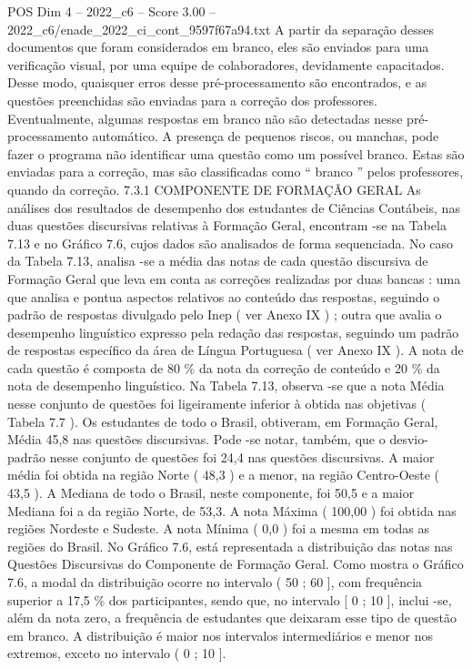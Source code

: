 \begin{textsample}{POS Dim 4 – 2022\_c6 – Score 3.00 – 2022\_c6/enade\_2022\_ci\_cont\_9597f67a94.txt}
A partir da separação desses documentos que foram considerados em branco, eles são enviados para uma verificação visual, por uma equipe de colaboradores, devidamente capacitados.
Desse modo, quaisquer erros desse pré-processamento são encontrados, e as questões preenchidas são enviadas para a correção dos professores.
Eventualmente, algumas respostas em branco não são detectadas nesse pré-processamento automático.
A presença de pequenos riscos, ou manchas, pode fazer o programa não identificar uma questão como um possível branco.
Estas são enviadas para a correção, mas são classificadas como “ branco ” pelos professores, quando da correção. 7.3.1 COMPONENTE DE FORMAÇÃO GERAL As análises dos resultados de desempenho dos estudantes de Ciências Contábeis, nas duas questões discursivas relativas à Formação Geral, encontram -se na Tabela 7.13 e no Gráfico 7.6, cujos dados são analisados de forma sequenciada.
No caso da Tabela 7.13, analisa -se a média das notas de cada questão discursiva de Formação Geral que leva em conta as correções realizadas por duas bancas : uma que analisa e pontua aspectos relativos ao conteúdo das respostas, seguindo o padrão de respostas divulgado pelo Inep ( ver Anexo IX ) ; outra que avalia o desempenho linguístico expresso pela redação das respostas, seguindo um padrão de respostas específico da área de Língua Portuguesa ( ver Anexo IX ).
A nota de cada questão é composta de 80 \% da nota da correção de conteúdo e 20 \% da nota de desempenho linguístico.
Na Tabela 7.13, observa -se que a nota Média nesse conjunto de questões foi ligeiramente inferior à obtida nas objetivas ( Tabela 7.7 ).
Os estudantes de todo o Brasil, obtiveram, em Formação Geral, Média 45,8 nas questões discursivas.
Pode -se notar, também, que o desvio-padrão nesse conjunto de questões foi 24,4 nas questões discursivas.
A maior média foi obtida na região Norte ( 48,3 ) e a menor, na região Centro-Oeste ( 43,5 ).
A Mediana de todo o Brasil, neste componente, foi 50,5 e a maior Mediana foi a da região Norte, de 53,3.
A nota Máxima ( 100,00 ) foi obtida nas regiões Nordeste e Sudeste.
A nota Mínima ( 0,0 ) foi a mesma em todas as regiões do Brasil.
No Gráfico 7.6, está representada a distribuição das notas nas Questões Discursivas do Componente de Formação Geral.
Como mostra o Gráfico 7.6, a modal da distribuição ocorre no intervalo ( 50 ; 60 ], com frequência superior a 17,5 \% dos participantes, sendo que, no intervalo [ 0 ; 10 ], inclui -se, além da nota zero, a frequência de estudantes que deixaram esse tipo de questão em branco.
A distribuição é maior nos intervalos intermediários e menor nos extremos, exceto no intervalo ( 0 ; 10 ].

\end{textsample}
